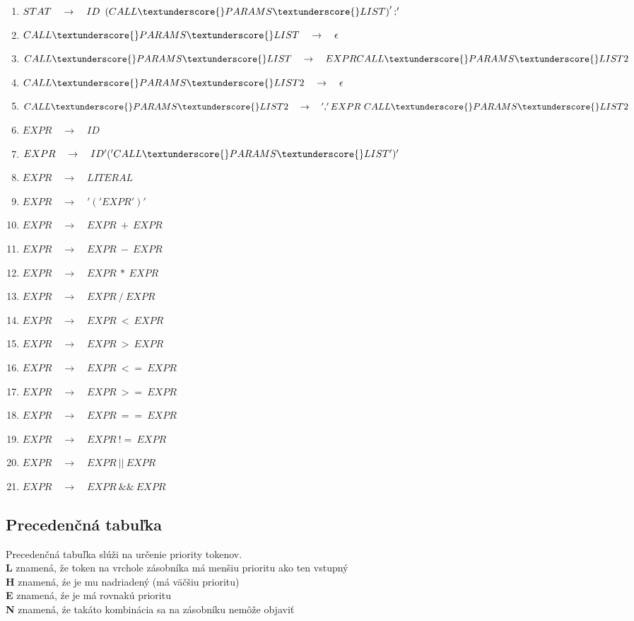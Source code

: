 \documentclass[12pt, a4paper]{article}
\begin{document}
\begin{enumerate}
				\item \( STAT\quad{}\rightarrow\quad{}ID\ \left( CALL\textunderscore{}PARAMS\textunderscore{}LIST \right) ';' \)
				\item \( CALL\textunderscore{}PARAMS\textunderscore{}LIST\quad{}\rightarrow\quad{}\epsilon \)
				\item \( CALL\textunderscore{}PARAMS\textunderscore{}LIST\quad{}\rightarrow\quad{}EXPR CALL\textunderscore{}PARAMS\textunderscore{}LIST2 \)
				\item \( CALL\textunderscore{}PARAMS\textunderscore{}LIST2\quad{}\rightarrow\quad{}\epsilon \)
				\item \( CALL\textunderscore{}PARAMS\textunderscore{}LIST2\quad{}\rightarrow\quad{}',' EXPR\ CALL\textunderscore{}PARAMS\textunderscore{}LIST2 \)
				\item \( EXPR\quad{}\rightarrow\quad{}ID \)
				\item \( EXPR\quad{}\rightarrow\quad{}ID '(' CALL\textunderscore{}PARAMS\textunderscore{}LIST ')' \)
				\item \( EXPR\quad{}\rightarrow\quad{}LITERAL \)
				\item \( EXPR\quad{}\rightarrow\quad{}'(' EXPR ')' \)
				\item \( EXPR\quad{}\rightarrow\quad{}EXPR\ +\ EXPR \)
				\item \( EXPR\quad{}\rightarrow\quad{}EXPR\ -\ EXPR \)
				\item \( EXPR\quad{}\rightarrow\quad{}EXPR\ *\ EXPR \)
				\item \( EXPR\quad{}\rightarrow\quad{}EXPR\ /\ EXPR \)
				\item \( EXPR\quad{}\rightarrow\quad{}EXPR\ <\ EXPR \)
				\item \( EXPR\quad{}\rightarrow\quad{}EXPR\ >\ EXPR \)
				\item \( EXPR\quad{}\rightarrow\quad{}EXPR\ <=\ EXPR \)
				\item \( EXPR\quad{}\rightarrow\quad{}EXPR\ >=\ EXPR \)
				\item \( EXPR\quad{}\rightarrow\quad{}EXPR\ ==\ EXPR \)
				\item \( EXPR\quad{}\rightarrow\quad{}EXPR\ !=\ EXPR \)
				\item \( EXPR\quad{}\rightarrow\quad{}EXPR\ ||\ EXPR \)
				\item \( EXPR\quad{}\rightarrow\quad{}EXPR\ \&\&\ EXPR \)
	        \end{enumerate}

        \subsection{Precedenčná tabuľka} \label{sec:tab}
	        Precedenčná tabuľka slúži na určenie priority tokenov.\\
	        \textbf{L} znamená, že token na vrchole zásobníka má menšiu prioritu ako ten vstupný\\
	        \textbf{H} znamená, źe je mu nadriadený (má väčšiu prioritu)\\
	        \textbf{E} znamená, źe je má rovnakú prioritu\\
	        \textbf{N} znamená, źe takáto kombinácia sa na zásobníku nemôže objaviť\\
	
\end{document}
